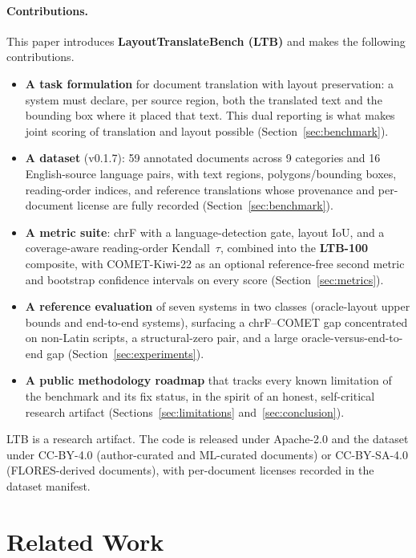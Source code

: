 \documentclass[11pt]{article}
\begin{document}
\paragraph{Contributions.} This paper introduces \textbf{LayoutTranslateBench
(LTB)} and makes the following contributions.
\begin{itemize}
  \item \textbf{A task formulation} for document translation with layout
  preservation: a system must declare, per source region, both the translated
  text and the bounding box where it placed that text. This dual reporting is
  what makes joint scoring of translation and layout possible
  (Section~\ref{sec:benchmark}).
  \item \textbf{A dataset} (v0.1.7): 59 annotated documents across 9 categories
  and 16 English-source language pairs, with text regions, polygons/bounding
  boxes, reading-order indices, and reference translations whose provenance and
  per-document license are fully recorded (Section~\ref{sec:benchmark}).
  \item \textbf{A metric suite}: chrF with a language-detection gate, layout
  IoU, and a coverage-aware reading-order Kendall~$\tau$, combined into the
  \textbf{LTB-100} composite, with COMET-Kiwi-22 as an optional reference-free
  second metric and bootstrap confidence intervals on every score
  (Section~\ref{sec:metrics}).
  \item \textbf{A reference evaluation} of seven systems in two classes
  (oracle-layout upper bounds and end-to-end systems), surfacing a chrF--COMET
  gap concentrated on non-Latin scripts, a structural-zero pair, and a large
  oracle-versus-end-to-end gap (Section~\ref{sec:experiments}).
  \item \textbf{A public methodology roadmap} that tracks every known
  limitation of the benchmark and its fix status, in the spirit of an honest,
  self-critical research artifact (Sections~\ref{sec:limitations}
  and~\ref{sec:conclusion}).
\end{itemize}

LTB is a research artifact. The code is released under Apache-2.0 and the
dataset under CC-BY-4.0 (author-curated and ML-curated documents) or
CC-BY-SA-4.0 (FLORES-derived documents), with per-document licenses recorded in
the dataset manifest.

\section{Related Work}
\label{sec:related}
\end{document}
